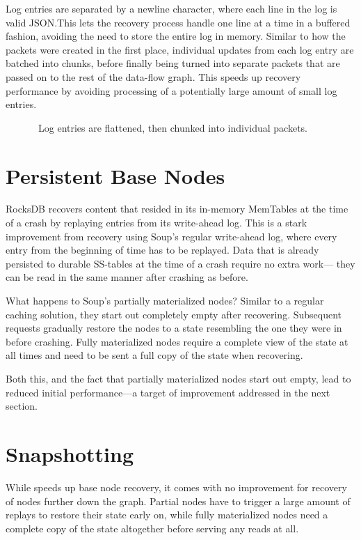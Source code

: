 Log entries are separated by a newline character, where each line in the log is
valid JSON.\@ This lets the recovery process handle one line at a time in a
buffered fashion, avoiding the need to store the entire log in memory. Similar
to how the packets were created in the first place, individual updates from each
log entry are batched into chunks, before finally being turned into separate
packets that are passed on to the rest of the data-flow graph. This speeds up
recovery performance by avoiding processing of a potentially large amount of
small log entries.


\begin{figure}[H]
  
  \caption{\
    Log entries are flattened, then chunked into individual packets.
  }\label{fig:log-chunking}
\end{figure}

\section{Persistent Base Nodes}

RocksDB recovers content that resided in its in-memory MemTables at the time of
a crash by replaying entries from its write-ahead log. This is a stark
improvement from recovery using Soup's regular write-ahead log, where every
entry from the beginning of time has to be replayed. Data that is already
persisted to durable SS-tables at the time of a crash require no extra work---
they can be read in the same manner after crashing as before.

What happens to Soup's partially materialized nodes? Similar to a regular
caching solution, they start out completely empty after recovering. Subsequent
requests gradually restore the nodes to a state resembling the one they were in
before crashing. Fully materialized nodes require a complete view of the state
at all times and need to be sent a full copy of the state when recovering.

Both this, and the fact that partially materialized nodes start out empty, lead
to reduced initial performance---a target of improvement addressed in the next
section.

\section{Snapshotting}\label{sec:snapshotting}

While  speeds up base node recovery, it comes with no
improvement for recovery of nodes further down the graph. Partial nodes have to
trigger a large amount of replays to restore their state early on, while fully
materialized nodes need a complete copy of the state altogether before serving
any reads at all.

